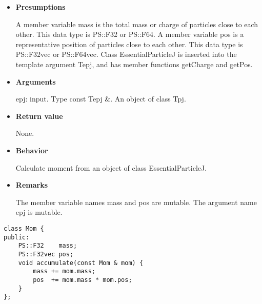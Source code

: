 \begin{itemize}

\item {\bf Presumptions}

  A member variable mass is the total mass or charge of particles
  close to each other. This data type is PS::F32 or PS::F64. A member
  variable pos is a representative position of particles close to each
  other. This data type is PS::F32vec or PS::F64vec. Class
  EssentialParticleJ is inserted into the template argument Tepj, and
  has member functions getCharge and getPos.

\item {\bf Arguments}

  epj: input. Type const Tepj \&. An object of class Tpj.
  
\item {\bf Return value}

  None.

\item {\bf Behavior}

  Calculate moment from an object of class EssentialParticleJ.
  
\item {\bf Remarks}

  The member variable names mass and pos are mutable. The argument
  name epj is mutable.

\end{itemize}


\begin{screen}
\begin{verbatim}
class Mom {
public:
    PS::F32    mass;
    PS::F32vec pos;
    void accumulate(const Mom & mom) {
        mass += mom.mass;
        pos  += mom.mass * mom.pos;
    }
};
\end{verbatim}
\end{screen}

